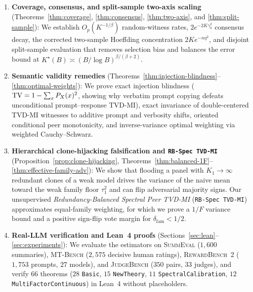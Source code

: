 \begin{enumerate}[leftmargin=*,itemsep=2pt]
\item \textbf{Coverage, consensus, and split-sample two-axis scaling}
  (Theorems~\ref{thm:coverage}, \ref{thm:consensus}, \ref{thm:two-axis}, and
  \ref{thm:split-sample}): We establish $O_p(K^{-1/\beta})$ random-witness
  rates, $2e^{-2K\gamma_0^2}$ consensus decay, the corrected two-sample
  Hoeffding concentration $2Ke^{-n\eta^2}$, and disjoint split-sample
  evaluation that removes selection bias and balances the error bound at $K^\star(B) \asymp (B/\log B)^{\beta/(\beta+2)}$.
\item \textbf{Semantic validity remedies} (Theorems~\ref{thm:injection-blindness}--\ref{thm:optimal-weights}):
  We prove exact injection blindness ($\mathrm{TV} = 1 - \sum_x P_X(x)^2$, showing
  why verbatim prompt copying defeats unconditional prompt--response TVD-MI),
  exact invariance of double-centered TVD-MI witnesses to additive prompt and
  verbosity shifts, oriented conditional peer monotonicity, and inverse-variance optimal weighting via weighted Cauchy--Schwarz.
\item \textbf{Hierarchical clone-hijacking falsification and \texttt{RB-Spec TVD-MI}}
  (Proposition~\ref{prop:clone-hijacking}, Theorems~\ref{thm:balanced-1F}--\ref{thm:effective-family-adv}):
  We show that flooding a panel with $K_1 \to \infty$ redundant clones of a
  weak model drives the variance of the naive mean toward the weak family floor
  $\tau_1^2$ and can flip adversarial majority signs. Our unsupervised
  \emph{Redundancy-Balanced Spectral Peer TVD-MI} (\texttt{RB-Spec TVD-MI})
  approximates equal-family weighting, for which we prove a $1/F$ variance bound and a positive sign-flip vote margin for $\delta_{\mathrm{fam}}<1/2$.
\item \textbf{Real-LLM verification and Lean~4 proofs}
  (Sections~\ref{sec:lean}--\ref{sec:experiments}): We evaluate the estimators on
  \textsc{SummEval} \citep{fabbri2021summeval} ($1,600$ summaries),
  \textsc{MT-Bench} \citep{zheng2023judging} ($2,575$ decisive human ratings),
  \textsc{RewardBench~2} \citep{malik2025rewardbench2} ($1,753$ prompts, $27$ models),
  and \textsc{JudgeBench} \citep{tan2025judgebench} ($350$ pairs, $33$ judges),
  and verify $66$ theorems ($28$ \texttt{Basic}, $15$ \texttt{NewTheory},
  $11$ \texttt{SpectralCalibration}, $12$ \texttt{MultiFactorContinuous})
  in Lean~4 without placeholders.
\end{enumerate}
